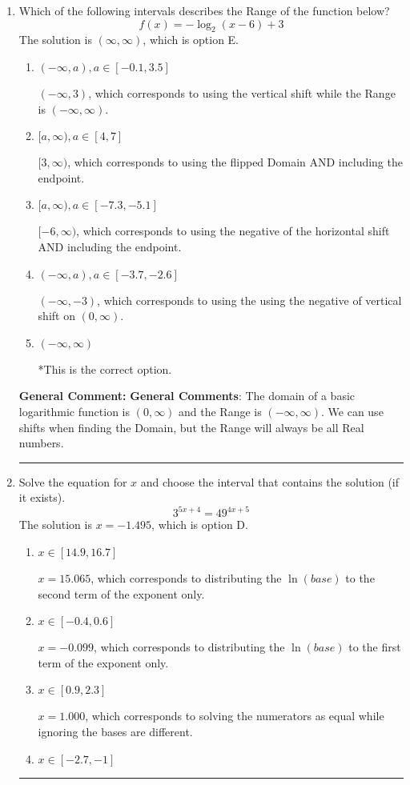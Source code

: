 \documentclass{extbook}[14pt]
\newcommand{\litem}[1]{\item #1

\rule{\textwidth}{0.4pt}}
\begin{document}
\begin{enumerate}\litem{
Which of the following intervals describes the Range of the function below?
\[ f(x) = -\log_2{(x-6)}+3 \]
The solution is \( (\infty, \infty) \), which is option E.\begin{enumerate}[label=\Alph*.]
\item \( (-\infty, a), a \in [-0.1, 3.5] \)

$(-\infty, 3)$, which corresponds to using the vertical shift while the Range is $(-\infty, \infty)$.
\item \( [a, \infty), a \in [4, 7] \)

$[3, \infty)$, which corresponds to using the flipped Domain AND including the endpoint.
\item \( [a, \infty), a \in [-7.3, -5.1] \)

$[-6, \infty)$, which corresponds to using the negative of the horizontal shift AND including the endpoint.
\item \( (-\infty, a), a \in [-3.7, -2.6] \)

$(-\infty, -3)$, which corresponds to using the using the negative of vertical shift on $(0, \infty)$.
\item \( (-\infty, \infty) \)

*This is the correct option.
\end{enumerate}

\textbf{General Comment:} \textbf{General Comments}: The domain of a basic logarithmic function is $(0, \infty)$ and the Range is $(-\infty, \infty)$. We can use shifts when finding the Domain, but the Range will always be all Real numbers.
}
\litem{
Solve the equation for $x$ and choose the interval that contains the solution (if it exists).
\[ 3^{5x+4} = 49^{4x+5} \]
The solution is \( x = -1.495 \), which is option D.\begin{enumerate}[label=\Alph*.]
\item \( x \in [14.9, 16.7] \)

$x = 15.065$, which corresponds to distributing the $\ln(base)$ to the second term of the exponent only.
\item \( x \in [-0.4, 0.6] \)

$x = -0.099$, which corresponds to distributing the $\ln(base)$ to the first term of the exponent only.
\item \( x \in [0.9, 2.3] \)

$x = 1.000$, which corresponds to solving the numerators as equal while ignoring the bases are different.
\item \( x \in [-2.7, -1] \)


\end{enumerate}}
\end{enumerate}
\end{document}
